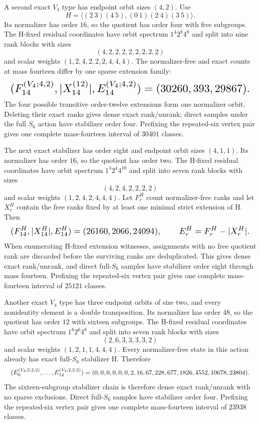 \documentclass{article}
\newcommand{\fitmath}[1]{\resizebox{0.99\linewidth}{!}{$\displaystyle #1$}}
\begin{document}
A second exact $V_4$ type has endpoint orbit sizes $(4,2)$. Use
\[
  H=\langle(2\ 3)(4\ 5),(0\ 1)(2\ 4)(3\ 5)\rangle.
\]
Its normalizer has order $16$, so the quotient has order four with five
subgroups. The H-fixed residual coordinates have orbit spectrum $1^4 2^8 4^8$
and split into nine rank blocks with sizes
\[
  (4,2,2,2,2,2,2,2,2)
\]
and scalar weights $(1,2,4,2,2,2,4,4,4)$. The normalizer-free and exact counts
at mass fourteen differ by one sparse extension family:
\begin{equation}
  \fitmath{%
    (F_{14}^{(V_4;4,2)},|X_{14}^{(12)}|,E_{14}^{(V_4;4,2)})
      =(30260,393,29867).
  }
  \label{eq:optimization-crazy-sextuple-s6-full-v4-42-ranking}
\end{equation}
The four possible transitive order-twelve extensions form one normalizer orbit.
Deleting their exact ranks gives dense exact rank/unrank; direct samples under
the full $S_6$ action have stabilizer order four. Prefixing the repeated-six
vertex pair gives one complete mass-fourteen interval of $30401$ classes.

The next exact stabilizer has order eight and endpoint orbit sizes $(4,1,1)$.
Its normalizer has order $16$, so the quotient has order two. The H-fixed
residual coordinates have orbit spectrum $1^4 2^4 4^{10}$ and split into seven
rank blocks with sizes
\[
  (4,2,4,2,2,2,2)
\]
and scalar weights $(1,2,4,2,4,4,4)$. Let $F_r^H$ count normalizer-free ranks
and let $X_r^H$ contain the free ranks fixed by at least one minimal strict
extension of H. Then
\begin{equation}
  \fitmath{%
    (F_{14}^H,|X_{14}^H|,E_{14}^H)=(26160,2066,24094),
    \qquad E_r^H=F_r^H-|X_r^H|.
  }
  \label{eq:optimization-crazy-sextuple-s6-full-order8-411-ranking}
\end{equation}
When enumerating H-fixed extension witnesses, assignments with no free quotient
rank are discarded before the surviving ranks are deduplicated. This gives
dense exact rank/unrank, and direct full-$S_6$ samples have stabilizer order
eight through mass fourteen. Prefixing the repeated-six vertex pair gives one
complete mass-fourteen interval of $25121$ classes.

Another exact $V_4$ type has three endpoint orbits of size two, and every
nonidentity element is a double transposition. Its normalizer has order $48$,
so the quotient has order $12$ with sixteen subgroups. The H-fixed residual
coordinates have orbit spectrum $1^8 2^6 4^8$ and split into seven rank blocks
with sizes
\[
  (2,6,3,3,3,3,2)
\]
and scalar weights $(1,2,1,1,4,4,4)$. Every normalizer-free state in this
action already has exact full-$S_6$ stabilizer H. Therefore
\begin{equation}
  \fitmath{%
    (E_0^{(V_4;2,2,2)},\ldots,E_{14}^{(V_4;2,2,2)})=
    (0,0,0,0,0,0,2,16,67,228,677,1826,4552,10678,23804).
  }
  \label{eq:optimization-crazy-sextuple-s6-full-v4-222-ranking}
\end{equation}
The sixteen-subgroup stabilizer chain is therefore dense exact rank/unrank with
no sparse exclusions. Direct full-$S_6$ samples have stabilizer order four.
Prefixing the repeated-six vertex pair gives one complete mass-fourteen
interval of $23938$ classes.
\end{document}

